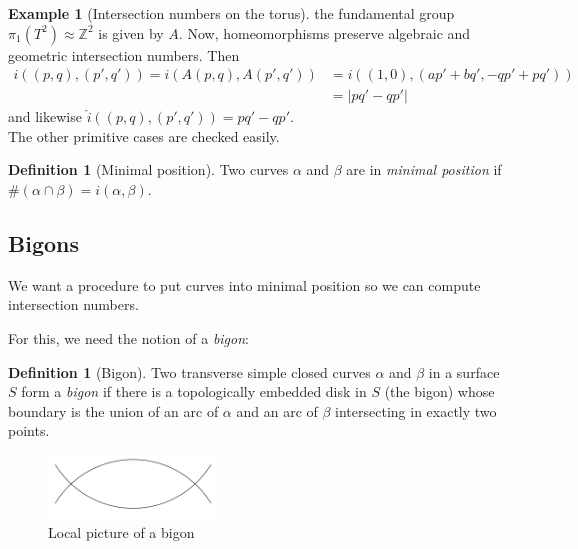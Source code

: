 \documentclass[reqno]{amsart}
\theoremstyle{definition}
\newtheorem{definition}[theorem]{Definition}
\newtheorem{example}[theorem]{Example}
\theoremstyle{remark}
\begin{document}
\begin{example}[Intersection numbers on the
    torus]
    the fundamental group $\pi_1 \left( T^2 \right) 
    \approx \mathbb{Z}^2$ is given by $A$.
    Now, homeomorphisms preserve
    algebraic and 
    geometric intersection numbers.
    Then
    \begin{align*}
    i \left( \left( p,q \right) , \left( p',q' \right)  \right) 
    = i \left( A \left( p,q \right) , A\left( p',q' \right)  \right) 
    &= i \left( \left( 1,0 \right) , \left( ap'+bq',
    -qp' + pq'\right)  \right)\\
    &= \left| pq' - qp'
 \right|
    \end{align*}
    and likewise 
    $\hat{i}\left( \left( p,q \right) , \left( p',q' \right) 
    \right) = pq' - qp'$.\\
    The other primitive cases are checked easily.
\end{example}


\begin{definition}[Minimal position]
    Two curves $\alpha$ and $\beta$ are in \textit{minimal
    position} if $\# \left( \alpha \cap \beta \right) =
    i\left( \alpha, \beta \right) $.
\end{definition}

\subsection*{Bigons}

We want a procedure to put curves into minimal position so
we can compute intersection numbers.

For this, we need the notion of a \textit{bigon}:

\begin{definition}[Bigon]
    Two transverse simple closed curves $\alpha$ and $\beta$ 
    in a surface $S$ form a \textit{bigon} if there is a
    topologically embedded disk in $S$ (the bigon) whose
    boundary is the union of an arc of $\alpha$ and an
    arc of  $\beta$ intersecting in exactly two points.
\end{definition}

\begin{figure}[http]
    \centering
    \includegraphics[width=0.4\textwidth]{bigon.png}
    \caption{Local picture of a bigon}
    \label{fig:bigon}
\end{figure}
\end{document}

